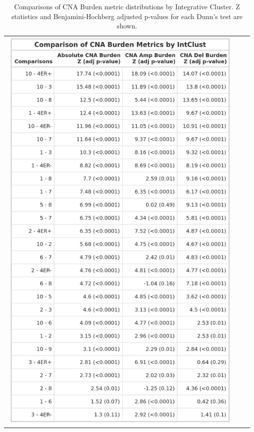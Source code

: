 \begin{table}[!ht]
\caption[Comparisons of CNA Burden metric distributions by Integrative Cluster.]{Comparisons of CNA Burden metric distributions by Integrative Cluster. Z statistics and Benjamini-Hochberg adjusted p-values for each Dunn's test are shown.}
\begin{minipage}[c]{0.45\textwidth}
\centering
\begin{tabular}{ccc}
\includegraphics[width=0.98\textwidth]{../tables/Chapter_2/Global_CNA_Burden_Metric_IntClust_Comparisons_1.png}
\end{tabular}

\end{minipage}
\end{table}
